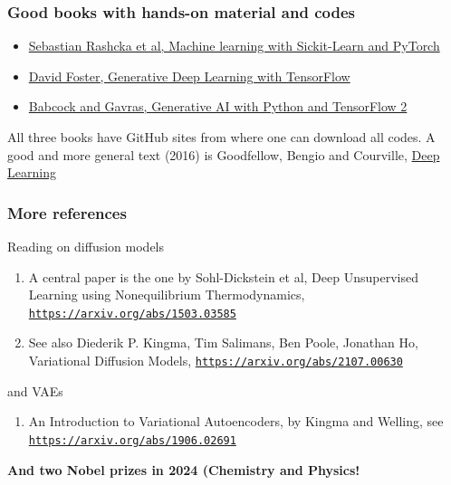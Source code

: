 \documentclass{beamer}
\begin{document}
\begin{frame}
\frametitle{Good books with hands-on material and codes}

\begin{block}{}
\begin{itemize}
\item \href{{https://sebastianraschka.com/blog/2022/ml-pytorch-book.html}}{Sebastian Rashcka et al, Machine learning with Sickit-Learn and PyTorch}

\item \href{{https://www.oreilly.com/library/view/generative-deep-learning/9781098134174/ch01.html}}{David Foster, Generative Deep Learning with TensorFlow}

\item \href{{https://github.com/PacktPublishing/Hands-On-Generative-AI-with-Python-and-TensorFlow-2}}{Babcock and Gavras, Generative AI with Python and TensorFlow 2}
\end{itemize}

\noindent
\end{block}

All three books have GitHub sites from where  one can download all codes. A good and more general text (2016)
is Goodfellow, Bengio and Courville, \href{{https://www.deeplearningbook.org/}}{Deep Learning}
\end{frame}

\begin{frame}
\frametitle{More references}

\begin{block}{Reading on diffusion models }
\begin{enumerate}
\item A central paper is the one by Sohl-Dickstein et al, Deep Unsupervised Learning using Nonequilibrium Thermodynamics, \href{{https://arxiv.org/abs/1503.03585}}{\nolinkurl{https://arxiv.org/abs/1503.03585}}

\item See also Diederik P. Kingma, Tim Salimans, Ben Poole, Jonathan Ho, Variational Diffusion Models, \href{{https://arxiv.org/abs/2107.00630}}{\nolinkurl{https://arxiv.org/abs/2107.00630}}
\end{enumerate}

\noindent
\end{block}   

\begin{block}{and VAEs }
\begin{enumerate}
\item An Introduction to Variational Autoencoders, by Kingma and Welling, see \href{{https://arxiv.org/abs/1906.02691}}{\nolinkurl{https://arxiv.org/abs/1906.02691}}
\end{enumerate}

\noindent
\end{block}

\textbf{And two Nobel prizes in 2024 (Chemistry and Physics!}
\end{frame}
\end{document}

